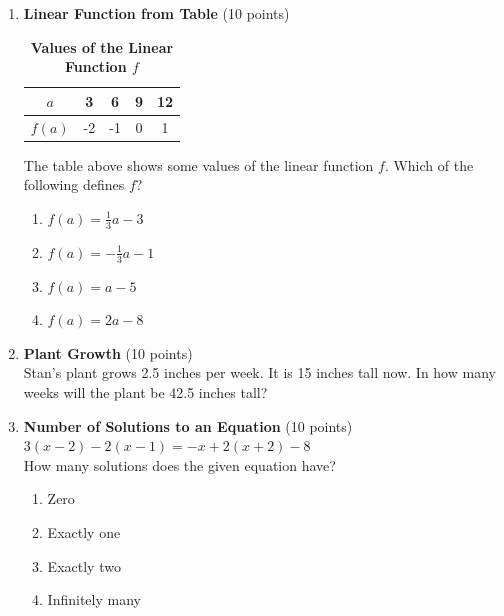 \begin{enumerate}
  
  \item \textbf{Linear Function from Table} (10 points)\\
  \begin{table}[h!]
  \centering
  \renewcommand{\arraystretch}{1.3}
  \setlength{\tabcolsep}{12pt}
  \caption*{\textbf{Values of the Linear Function $f$}}
  \begin{tabular}{|c|c|c|c|c|}
  \hline
  $a$ & 3 & 6 & 9 & 12 \\
  \hline
  $f(a)$ & -2 & -1 & 0 & 1 \\
  \hline
  \end{tabular}
  \end{table}
  The table above shows some values of the linear function $f$. Which of the following defines $f$?
  \begin{enumerate}[label=(\Alph*)]
    \item $f(a)=\frac{1}{3}a-3$
    \item $f(a)=-\frac{1}{3}a-1$
    \item $f(a)=a-5$
    \item $f(a)=2a-8$
  \end{enumerate}
  \begin{subanswer}
  \end{subanswer}

  \item \textbf{Plant Growth} (10 points)\\
  Stan's plant grows 2.5 inches per week. It is 15 inches tall now. In how many weeks will the plant be 42.5 inches tall?
  \begin{subanswer}
  \end{subanswer}

  \item \textbf{Number of Solutions to an Equation} (10 points)\\
  $3(x-2)-2(x-1)=-x+2(x+2)-8$\\
  How many solutions does the given equation have?
  \begin{enumerate}[label=(\Alph*)]
    \item Zero
    \item Exactly one
    \item Exactly two
    \item Infinitely many
  \end{enumerate}
  \begin{subanswer}
  \end{subanswer}



\end{enumerate}
